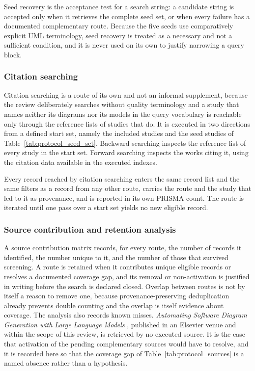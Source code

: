 Seed recovery is the acceptance test for a search string: a candidate string is accepted only when it retrieves the complete seed set, or when every failure has a documented complementary route. Because the five seeds use comparatively explicit UML terminology, seed recovery is treated as a necessary and not a sufficient condition, and it is never used on its own to justify narrowing a query block.

\subsubsection{Citation searching}

Citation searching is a route of its own and not an informal supplement, because the review deliberately searches without quality terminology and a study that names neither its diagrams nor its models in the query vocabulary is reachable only through the reference lists of studies that do. It is executed in two directions from a defined start set, namely the included studies and the seed studies of Table~\ref{tab:protocol_seed_set}. Backward searching inspects the reference list of every study in the start set. Forward searching inspects the works citing it, using the citation data available in the executed indexes.

Every record reached by citation searching enters the same record list and the same filters as a record from any other route, carries the route and the study that led to it as provenance, and is reported in its own PRISMA count. The route is iterated until one pass over a start set yields no new eligible record.

\subsubsection{Source contribution and retention analysis}

A source contribution matrix records, for every route, the number of records it identified, the number unique to it, and the number of those that survived screening. A route is retained when it contributes unique eligible records or resolves a documented coverage gap, and its removal or non-activation is justified in writing before the search is declared closed. Overlap between routes is not by itself a reason to remove one, because provenance-preserving deduplication already prevents double counting and the overlap is itself evidence about coverage. The analysis also records known misses. \textit{Automating Software Diagram Generation with Large Language Models} \cite{Gheorghita2025Diagrams}, published in an Elsevier venue and within the scope of this review, is retrieved by no executed source. It is the case that activation of the pending complementary sources would have to resolve, and it is recorded here so that the coverage gap of Table~\ref{tab:protocol_sources} is a named absence rather than a hypothesis.

